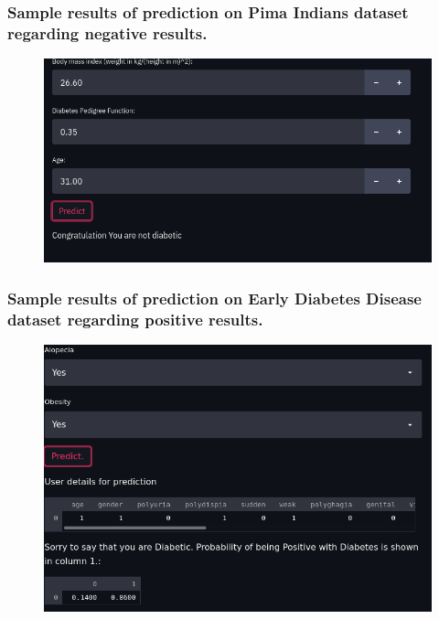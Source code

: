 \documentclass[11pt]{article}
\begin{document}
\subsubsection{Sample results of prediction on Pima Indians dataset regarding negative results.}
\begin{figure}[h]
	\centerline{\small 
		\includegraphics[height=0.25\textheight]  {Pneg}}
\end{figure}
\newpage
\subsubsection{Sample results of prediction on Early Diabetes Disease dataset regarding positive results.}
\begin{figure}[h]
	\centerline{\small 
		\includegraphics[height=0.35\textheight]  {Epos}}
\end{figure}
\end{document}
